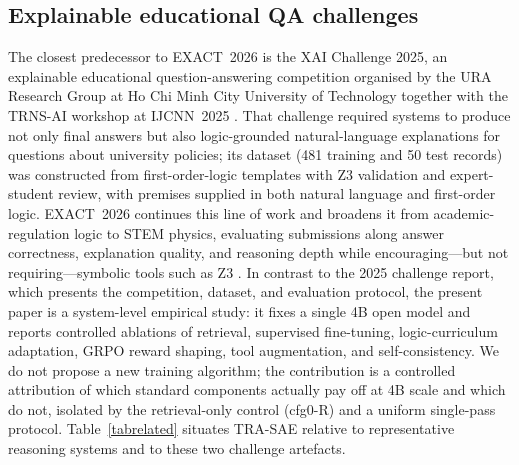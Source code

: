 \documentclass[APA,twocolumn]{USG}
\newcommand{\modelname}{TRA-SAE}
\newcommand{\dataset}{EXACT~2026}
\begin{document}
\subsection{Explainable educational QA challenges}
The closest predecessor to \dataset{} is the XAI Challenge 2025, an explainable
educational question-answering competition organised by the URA Research Group at
Ho Chi Minh City University of Technology together with the TRNS-AI workshop at
IJCNN~2025 \citep{Nguyen2025XAIChallenge}. That challenge required systems to
produce not only final answers but also logic-grounded natural-language
explanations for questions about university policies; its dataset (481 training
and 50 test records) was constructed from first-order-logic templates with Z3
validation and expert-student review, with premises supplied in both natural
language and first-order logic. \dataset{} continues this line of work and
broadens it from academic-regulation logic to STEM physics, evaluating
submissions along answer correctness, explanation quality, and reasoning depth
while encouraging---but not requiring---symbolic tools such as Z3
\citep{EXACT2026}. In contrast to the 2025 challenge report, which presents the
competition, dataset, and evaluation protocol, the present paper is a
system-level empirical study: it fixes a single 4B open model and reports
controlled ablations of retrieval, supervised fine-tuning, logic-curriculum
adaptation, GRPO reward shaping, tool augmentation, and self-consistency.
We do not propose a new training algorithm; the contribution is a controlled
attribution of which standard components actually pay off at 4B scale and which
do not, isolated by the retrieval-only control (cfg0-R) and a uniform single-pass
protocol.
Table~\ref{tabrelated} situates \modelname{} relative to representative reasoning
systems and to these two challenge artefacts.
\end{document}
